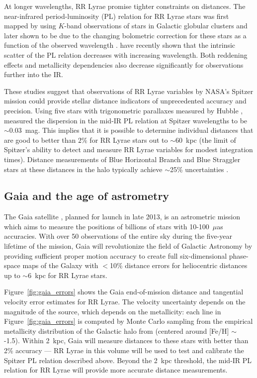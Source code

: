 \documentclass[preprint]{aastex}
\begin{document}
At longer wavelengths, RR Lyrae promise tighter constraints on
distances.  The near-infrared period-luminosity (PL) relation for RR
Lyrae stars was first mapped by \citet{longmore86} using $K$-band
observations of stars in Galactic globular clusters and later shown to
be due to the changing bolometric correction for these stars as a
function of the observed wavelength \citep{catelan04}.
\citet{madore12} have recently shown that the intrinsic scatter of the
PL relation decreases with increasing wavelength. Both reddening
effects and metallicity dependencies also decrease significantly for
observations further into the IR.

These studies suggest that observations of RR Lyrae variables by
NASA's Spitzer mission could provide stellar distance indicators of
unprecedented accuracy and precision.  Using five stars with
trigonometric parallaxes measured by Hubble \citep{benedict11},
\citet{madore12} measured the dispersion in the mid-IR PL relation at
Spitzer wavelengths to be $\sim$0.03~mag. This implies that it is
possible to determine individual distances that are good to better
than $2\%$ for RR Lyrae stars out to $\sim$60~kpc (the limit of
Spitzer's ability to detect and measure RR Lyrae variables for modest
integration times). Distance measurements of Blue Horizontal Branch
and Blue Straggler stars at these distances in the halo typically
achieve $\sim$25\% uncertainties \citep[e.g.,][]{deason12b}.


\subsection{Gaia and the age of astrometry}
\label{sec:gaia}
The Gaia satellite \citep{gaia01}, planned for launch in late 2013, is
an astrometric mission which aims to measure the positions of billions
of stars with 10-100~$\mu$as accuracies. With over 50 observations of
the entire sky during the five-year lifetime of the mission, Gaia will
revolutionize the field of Galactic Astronomy by providing sufficient
proper motion accuracy to create full six-dimensional phase-space maps
of the Galaxy with $<$10\% distance errors for heliocentric distances
up to $\sim$6~kpc for RR Lyrae stars.

Figure~\ref{fig:gaia_errors} shows the Gaia end-of-mission distance
and tangential velocity error estimates for RR Lyrae. The velocity
uncertainty depends on the magnitude of the source, which depends on
the metallicity: each line in Figure~\ref{fig:gaia_errors} is computed
by Monte Carlo sampling from the empirical metallicity distribution of
the Galactic halo from \cite{ivezic08} (centered around [Fe/H] $\sim$
-1.5). Within 2~kpc, Gaia will measure distances to these stars with
better than 2\% accuracy --- RR Lyrae in this volume will be used to
test and calibrate the Spitzer PL relation described above. Beyond the
2~kpc threshold, the mid-IR PL relation for RR Lyrae will provide more
accurate distance measurements.
\end{document}
